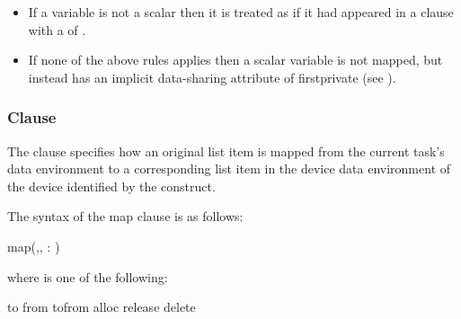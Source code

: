 \begin{itemize}
\begin{ccppspecific}
\end{ccppspecific}


\item If a variable is not a scalar then it is treated as if it had appeared 
    in a  clause with a  of .


\item If none of the above rules applies then a scalar variable is not
mapped, but instead has an implicit data-sharing attribute of
firstprivate (see ).
\end{itemize}

\subsubsection{ Clause}
\label{subsec:map Clause}
\summary
The  clause specifies how an original list item is mapped from the current task's data environment to a corresponding list item in the device data environment of the device identified by the construct.

\syntax
The syntax of the map clause is as follows:

\begin{ompSyntax}
map(\plc{[ [map-type-modifier[},\plc{] [map-type-modifier[},\plc{] ...] map-type} : \plc{] list})
\end{ompSyntax}

where  is one of the following:

\begin{indentedcodelist}
to
from
tofrom
alloc
release
delete
\end{indentedcodelist}

